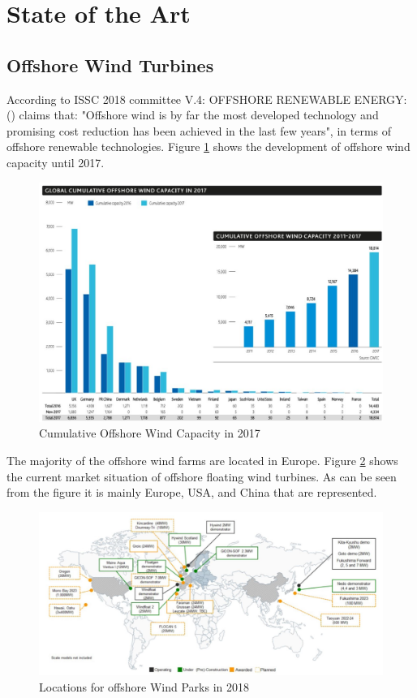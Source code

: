 \section{State of the Art}
\subsection{Offshore Wind Turbines}
According to ISSC 2018 committee V.4: OFFSHORE RENEWABLE ENERGY: (\cite{Gao2018}) claims that: "Offshore wind is by far the most developed technology and
promising cost reduction has been achieved in the last few years", in terms of offshore renewable technologies. Figure \ref{fig:sit17} shows the development of offshore wind capacity until 2017. 

\begin{figure}[H]
\centering
\includegraphics[scale=0.8]{figures/sit17}
\caption[$\; \:$Cumulative Offshore Wind Capacity in 2017]{Cumulative Offshore Wind Capacity in 2017 \cite{GWEC2018}}
 \label{fig:sit17}
\end{figure}

\noindent The majority of the offshore wind farms are located in Europe. Figure \ref{fig:world} shows the current market situation of offshore floating wind turbines. As can be seen from the figure it is mainly Europe, USA, and China that are represented. 


\begin{figure}[H]
\centering
\includegraphics[scale=0.54]{figures/world}
\caption[$\; \:$Locations for offshore Wind Parks in 2018]{Locations for offshore Wind Parks in 2018 \cite{Gao2018}}
 \label{fig:world}
\end{figure}

